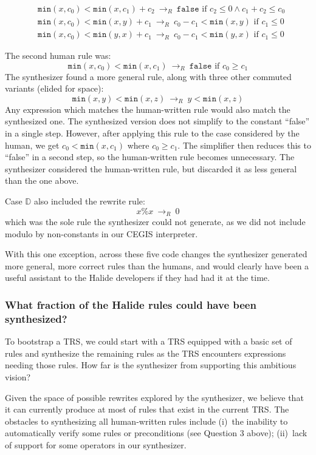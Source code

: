 \documentclass[acmsmall,review]{acmart}\settopmatter{printfolios=true,printccs=false,printacmref=false}
\newcommand{\hmin}[0]{\texttt{min}}
\newcommand{\rewrites}[0]{\:\rightarrow_{R}\:}
\newcommand{\pred}[0]{\textrm{ if }}
\newcommand{\hfalse}[0]{\texttt{false}}
\begin{document}
\begin{align*}
& \hmin(x, c_0) < \hmin(x, c_1) + c_2 \rewrites  \hfalse \pred c_2 \leq 0 \wedge c_1 + c_2 \leq c_0 \\
& \hmin(x, c_0) < \hmin(x, y) + c_1 \rewrites c_0 - c_1 < \hmin(x, y) \pred c_1 \leq 0 \\
& \hmin(x, c_0) < \hmin(y, x) + c_1 \rewrites c_0 - c_1 < \hmin(y, x) \pred c_1 \leq 0
\end{align*}

The second human rule was:
\[
\hmin(x, c_0) < \hmin(x, c_1) \rewrites \hfalse \pred c_0 \geq c_1
\]
The synthesizer found a more general rule, along with three other commuted variants (elided for space):
\[
\hmin(x, y) < \hmin(x, z) \rewrites y < \hmin(x, z)
\]
Any expression which matches the human-written rule would also match the synthesized one. The synthesized version does not simplify to the constant “false” in a single step. However, after applying this rule to the case considered by the human, we get $c_0 < \hmin(x, c_1)$ where $c_0 \geq c_1$. The simplifier then reduces this to “false” in a second step, so the human-written rule becomes unnecessary. The synthesizer considered the human-written rule, but discarded it as less general than the one above.

Case $\mathbb{D}$ also included the rewrite rule: 
\[
x \% x \rewrites 0
\]
which was the sole rule the synthesizer could not generate, as we did not include modulo by non-constants in our CEGIS interpreter.

With this one exception, across these five code changes the synthesizer generated more general, more correct rules than the humans, and would clearly have been a useful assistant to the Halide developers if they had had it at the time.


\subsubsection{What fraction of the Halide rules could have been synthesized?}
\label{sub:replacementexperiment}
To bootstrap a TRS, we could start with a TRS equipped with a basic set of rules and synthesize the remaining rules as the TRS encounters expressions needing those rules.  How far is the synthesizer from supporting this ambitious vision?

Given the space of possible rewrites explored by the synthesizer, we believe that it can currently produce at most \PercentPossibleToSynth{} of rules that exist in the current TRS. The obstacles to synthesizing all human-written rules include (i)~the inability to automatically verify some rules or preconditions (see Question 3 above); (ii)~lack of support for some operators in our synthesizer. 
\end{document}
